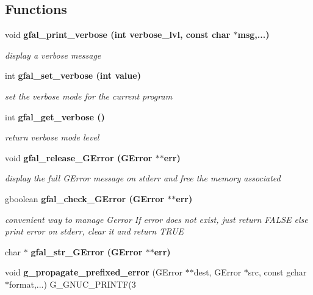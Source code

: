 \subsection*{Functions}
\begin{CompactItemize}
\item 
void \bf{gfal\_\-print\_\-verbose} (int verbose\_\-lvl, const char $\ast$msg,...)
\begin{CompactList}\small\item\em display a verbose message \item\end{CompactList}\item 
int \bf{gfal\_\-set\_\-verbose} (int value)
\begin{CompactList}\small\item\em set the verbose mode for the current program \item\end{CompactList}\item 
int \bf{gfal\_\-get\_\-verbose} ()\label{gfal__common__errverbose_8h_135b3fdd775aa7215e2ab4de1eea495f}

\begin{CompactList}\small\item\em return verbose mode level \item\end{CompactList}\item 
void \bf{gfal\_\-release\_\-GError} (GError $\ast$$\ast$err)\label{gfal__common__errverbose_8h_1441ea4b8176eb0cf3099009b950a3e9}

\begin{CompactList}\small\item\em display the full GError message on stderr and free the memory associated \item\end{CompactList}\item 
gboolean \bf{gfal\_\-check\_\-GError} (GError $\ast$$\ast$err)\label{gfal__common__errverbose_8h_9167aee5bda42b71a982f863e88f7bfd}

\begin{CompactList}\small\item\em convenient way to manage Gerror If error does not exist, just return FALSE else print error on stderr, clear it and return TRUE \item\end{CompactList}\item 
char $\ast$ \bf{gfal\_\-str\_\-GError} (GError $\ast$$\ast$err)
\item 
void \textbf{g\_\-propagate\_\-prefixed\_\-error} (GError $\ast$$\ast$dest, GError $\ast$src, const gchar $\ast$format,...) G\_\-GNUC\_\-PRINTF(3\label{gfal__common__errverbose_8h_f9695e2ac1722715b687c1818cb2993d}


\end{CompactItemize}
